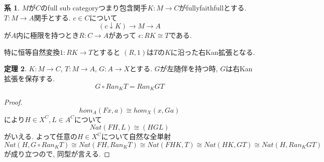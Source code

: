 \documentclass[dvipdfmx,a4paper,11pt]{article}
\theoremstyle{definition}
\newtheorem{thm}{定理}
\newtheorem{cor}[thm]{系}
\begin{document}
 \begin{tcolorbox}
 [colback = white, colframe = green!35!black, fonttitle = \bfseries,breakable = true]
\begin{cor}
$M$が$C$のfull sub categoryつまり包含関手$K : M \to C$がfullyfaithfullとする. 
$T : M \to A$関手とする. 
$c \in C$について
$$
(c\downarrow K) \to M \to A
$$
が$A$内に極限を持つとき$R : C \to A$があって
$\epsilon : RK \cong T$である.

特に恒等自然変換$1: RK \to T$とすると
$(R,1)$は$T$の$K$に沿った右Kan拡張となる. 
\end{cor}
\end{tcolorbox}

 \begin{tcolorbox}
 [colback = white, colframe = green!35!black, fonttitle = \bfseries,breakable = true]
\begin{thm}
$K : M \to C$, $T : M \to A$, $G :  A \to X$とする.
$G$が左随伴を持つ時, $G$は右Kan拡張を保存する. 
$$
G \circ Ran_{K} T = Ran_{K}GT
$$
\end{thm}
\end{tcolorbox}

\begin{proof}
$$
hom_{A}(Fx, a) \cong hom_{X}(x,Ga)
$$
により$H \in X^C, L \in A^C$について
$$
Nat(FH, L) \cong (H GL)
$$
がいえる.
よって任意の$H \in X^C$について自然な全単射
$$
Nat(H, G\circ Ran_{K} T )
\cong 
Nat(FH, Ran_{K} T )
\cong 
Nat(FHK, T)
\cong 
Nat(HK, GT)
\cong 
Nat(H, Ran_{K}GT)
$$
が成り立つので, 同型が言える. 
\end{proof}
\end{document}

